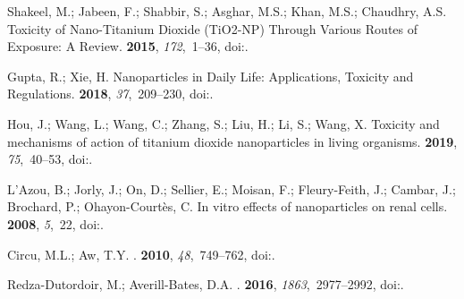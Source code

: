 \documentclass[ijms,article,accept,moreauthors,pdftex]{Definitions/mdpi}
\begin{document}
\begin{thebibliography}{999}
Shakeel, M.; Jabeen, F.; Shabbir, S.; Asghar, M.S.; Khan, M.S.; Chaudhry, A.S.
\newblock Toxicity of Nano-Titanium Dioxide ({TiO}2-{NP}) Through Various
  Routes of Exposure: A Review.
 {\bf 2015}, {\em 172},~1--36,
\newblock
  doi:{\href{https://doi.org/10.1007/s12011-015-0550-x}{}}.

Gupta, R.; Xie, H.
\newblock Nanoparticles in Daily Life: Applications, Toxicity and Regulations.
  {\bf 2018}, {\em 37},~209--230,
\newblock
  doi:{\href{https://doi.org/10.1615/jenvironpatholtoxicoloncol.2018026009}{}}.

Hou, J.; Wang, L.; Wang, C.; Zhang, S.; Liu, H.; Li, S.; Wang, X.
\newblock Toxicity and mechanisms of action of titanium dioxide nanoparticles
  in living organisms.
 {\bf 2019}, {\em 75},~40--53,
\newblock
  doi:{\href{https://doi.org/10.1016/j.jes.2018.06.010}{}}.

L'Azou, B.; Jorly, J.; On, D.; Sellier, E.; Moisan, F.; Fleury-Feith, J.;
  Cambar, J.; Brochard, P.; Ohayon-Court{\`{e}}s, C.
\newblock In vitro effects of nanoparticles on renal cells.
 {\bf 2008}, {\em 5},~22,
\newblock
  doi:{\href{https://doi.org/10.1186/1743-8977-5-22}{}}.

Circu, M.L.; Aw, T.Y.
.
 {\bf 2010}, {\em 48},~749--762,
\newblock
  doi:{\href{https://doi.org/10.1016/j.freeradbiomed.2009.12.022}{}}.

Redza-Dutordoir, M.; Averill-Bates, D.A.
.
 {\bf 2016}, {\em
  1863},~2977--2992,
\newblock
  doi:{\href{https://doi.org/10.1016/j.bbamcr.2016.09.012}{}}.


\end{thebibliography}
\end{document}
